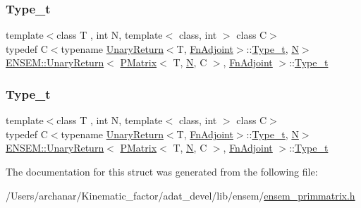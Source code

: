 \subsubsection{\texorpdfstring{Type\_t}{Type\_t}\hspace{0.1cm}{\footnotesize\ttfamily [1/2]}}
{\footnotesize\ttfamily template$<$class T , int N, template$<$ class, int $>$ class C$>$ \\
typedef C$<$typename \mbox{\hyperlink{structENSEM_1_1UnaryReturn}{Unary\+Return}}$<$T, \mbox{\hyperlink{structENSEM_1_1FnAdjoint}{Fn\+Adjoint}}$>$\+::\mbox{\hyperlink{structENSEM_1_1UnaryReturn_3_01PMatrix_3_01T_00_01N_00_01C_01_4_00_01FnAdjoint_01_4_a048cd4378899462da7bbb8d274d24eb0}{Type\+\_\+t}}, \mbox{\hyperlink{operator__name__util_8cc_a7722c8ecbb62d99aee7ce68b1752f337}{N}}$>$ \mbox{\hyperlink{structENSEM_1_1UnaryReturn}{E\+N\+S\+E\+M\+::\+Unary\+Return}}$<$ \mbox{\hyperlink{classENSEM_1_1PMatrix}{P\+Matrix}}$<$ T, \mbox{\hyperlink{operator__name__util_8cc_a7722c8ecbb62d99aee7ce68b1752f337}{N}}, C $>$, \mbox{\hyperlink{structENSEM_1_1FnAdjoint}{Fn\+Adjoint}} $>$\+::\mbox{\hyperlink{structENSEM_1_1UnaryReturn_3_01PMatrix_3_01T_00_01N_00_01C_01_4_00_01FnAdjoint_01_4_a048cd4378899462da7bbb8d274d24eb0}{Type\+\_\+t}}}

\mbox{\label{structENSEM_1_1UnaryReturn_3_01PMatrix_3_01T_00_01N_00_01C_01_4_00_01FnAdjoint_01_4_a048cd4378899462da7bbb8d274d24eb0}} 
\subsubsection{\texorpdfstring{Type\_t}{Type\_t}\hspace{0.1cm}{\footnotesize\ttfamily [2/2]}}
{\footnotesize\ttfamily template$<$class T , int N, template$<$ class, int $>$ class C$>$ \\
typedef C$<$typename \mbox{\hyperlink{structENSEM_1_1UnaryReturn}{Unary\+Return}}$<$T, \mbox{\hyperlink{structENSEM_1_1FnAdjoint}{Fn\+Adjoint}}$>$\+::\mbox{\hyperlink{structENSEM_1_1UnaryReturn_3_01PMatrix_3_01T_00_01N_00_01C_01_4_00_01FnAdjoint_01_4_a048cd4378899462da7bbb8d274d24eb0}{Type\+\_\+t}}, \mbox{\hyperlink{operator__name__util_8cc_a7722c8ecbb62d99aee7ce68b1752f337}{N}}$>$ \mbox{\hyperlink{structENSEM_1_1UnaryReturn}{E\+N\+S\+E\+M\+::\+Unary\+Return}}$<$ \mbox{\hyperlink{classENSEM_1_1PMatrix}{P\+Matrix}}$<$ T, \mbox{\hyperlink{operator__name__util_8cc_a7722c8ecbb62d99aee7ce68b1752f337}{N}}, C $>$, \mbox{\hyperlink{structENSEM_1_1FnAdjoint}{Fn\+Adjoint}} $>$\+::\mbox{\hyperlink{structENSEM_1_1UnaryReturn_3_01PMatrix_3_01T_00_01N_00_01C_01_4_00_01FnAdjoint_01_4_a048cd4378899462da7bbb8d274d24eb0}{Type\+\_\+t}}}



The documentation for this struct was generated from the following file\+:\begin{DoxyCompactItemize}
\item 
/\+Users/archanar/\+Kinematic\+\_\+factor/adat\+\_\+devel/lib/ensem/\mbox{\hyperlink{lib_2ensem_2ensem__primmatrix_8h}{ensem\+\_\+primmatrix.\+h}}\end{DoxyCompactItemize}

